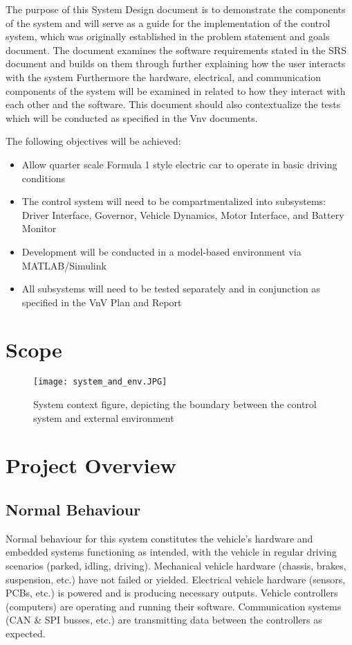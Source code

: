 \documentclass[12pt, titlepage]{article}
\begin{document}
The purpose of this System Design document is to demonstrate the components of the system and will serve as a guide for the implementation of the control system, which was originally established in the problem statement and goals document.  The document examines the software requirements stated in the SRS document and builds on them through further explaining how the user interacts with the system Furthermore the hardware, electrical, and communication components of the system will be examined in related to how they interact with each other and the software. This document should also contextualize the tests which will be conducted as specified in the Vnv documents.

The following objectives will be achieved:
\begin{itemize}
    \item Allow quarter scale Formula 1 style electric car to operate in basic driving conditions
    \item The control system will need to be compartmentalized into subsystems: Driver Interface, Governor, Vehicle Dynamics, Motor Interface, and Battery Monitor
    \item Development will be conducted in a model-based environment via MATLAB/Simulink
    \item All subsystems will need to be tested separately and in conjunction as specified in the VnV Plan and Report
\end{itemize}

\newpage
\section{Scope}

\begin{figure}[h!]
    \texttt{[image: system\_and\_env.JPG]}
    \centering
    \caption{System context figure, depicting the boundary between the control system and external environment}
\end{figure}

\section{Project Overview}

\subsection{Normal Behaviour}

Normal behaviour for this system constitutes the vehicle's hardware and embedded systems functioning as intended, 
with the vehicle in regular driving scenarios (parked, idling, driving). Mechanical vehicle hardware (chassis, 
brakes, suspension, etc.) have not failed or yielded. Electrical vehicle hardware (sensors, PCBs, etc.) is powered 
and is producing necessary outputs. Vehicle controllers (computers) are operating and running their software. 
Communication systems (CAN & SPI busses, etc.) are transmitting data between the controllers as expected. 
\end{document}
